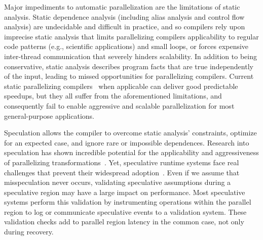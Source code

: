 Major impediments to automatic parallelization are the limitations of static
analysis. Static dependence analysis (including alias analysis and control flow
analysis) are undecidable and difficult in practice, and so compilers rely upon
imprecise static analysis that limits parallelizing compilers applicability to
regular code patterns (e.g., scientific applications) and small loops, or forces
expensive inter-thread communication that severely hinders scalability.
%
In addition to being conservative, static analysis describes program facts that
are true independently of the input, leading to missed opportunities for
parallelizing compilers.
Current static parallelizing compilers~\cite{HELIX, PS-DSWP, SUIF, non-SPEC
doall ...} when applicable can deliver good predictable speedups, but they all
suffer from the aforementioned limitations, and consequently fail to enable
aggressive and scalable parallelization for most general-purpose applications.

Speculation allows the compiler to overcome static analysis' constraints,
optimize for an expected
case, and ignore rare or impossible dependences.  Research into speculation has
shown incredible potential for the applicability and aggressiveness of
parallelizing transformations~\cite{Uncovering_malhke, privateer}.
%
Yet, speculative runtime systems face real challenges that prevent their
widespread adoption~\cite{cascaval:08:stmtoy:short, ..}. Even if we assume that
misspeculation never occurs, validating speculative assumptions during a
speculative region may have a large impact on performance.
%
Most speculative systems perform this validation by instrumenting operations
within the parallel region to log or communicate speculative events to a
validation system.  These validation checks add to parallel region latency in
the common case, not only during recovery.

